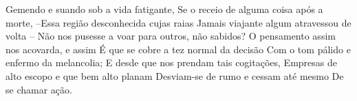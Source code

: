 Gemendo e suando sob a vida fatigante,
Se o receio de alguma coisa após a morte,
–Essa região desconhecida cujas raias
Jamais viajante algum atravessou de volta –
Não nos pusesse a voar para outros, não sabidos?
O pensamento assim nos acovarda, e assim
É que se cobre a tez normal da decisão
Com o tom pálido e enfermo da melancolia;
E desde que nos prendam tais cogitações,
Empresas de alto escopo e que bem alto planam
Desviam-se de rumo e cessam até mesmo
De se chamar ação.